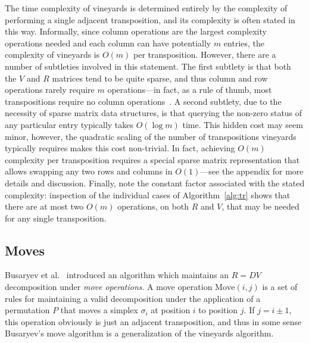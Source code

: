 \documentclass{siamart190516}
\begin{document}
 The time complexity of vineyards is determined entirely by the complexity of performing a single adjacent transposition, and its complexity is often stated in this way. Informally, since column operations are the largest complexity operations needed and each column can have potentially $m$ entries, the complexity of vineyards is $O(m)$ per transposition. 
 However, there are a number of subtleties involved in this statement. 
 The first subtlety is that both the $V$ and $R$ matrices tend to be quite sparse, and thus column and row operations rarely require $m$ operations---in fact, as a rule of thumb, most transpositions require no column operations~\cite{edelsbrunner2000topological}. A second subtlety, due to the necessity of sparse matrix data structures, is that querying the non-zero status of any particular entry typically takes $O(\log m)$ time. This hidden cost may seem minor, however, the quadratic scaling of the number of transpositions vineyards typically requires makes this cost non-trivial.   
In fact, achieving $O(m)$ complexity per transposition requires a special sparse matrix representation that allows swapping any two rows and columns in $O(1)$---see the appendix for more details and discussion. Finally, note the constant factor associated with the stated complexity: inspection of the individual cases of Algorithm~\ref{alg:tr} shows that there are at most two $O(m)$ operations, on both $R$ and $V$, that may be needed for any single transposition.
 

\subsection{Moves}\label{sec:moves} Busaryev et al.~\cite{busaryev2010tracking} introduced an algorithm which maintains an $R = D V$ decomposition under \emph{move operations}. A move operation $\mathrm{Move}(i,j)$ is a set of rules for maintaining a valid decomposition under the application of a permutation $P$ that moves a simplex $\sigma_i$ at position $i$ to position $j$. If $j = i \pm 1$, this operation obviously is just an adjacent transposition, and thus in some sense Busaryev's move algorithm is a generalization of the vineyards algorithm.
\end{document}
